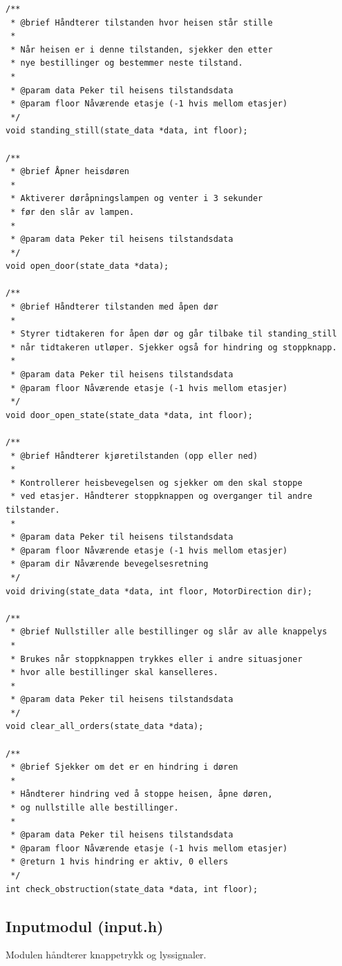\begin{lstlisting}[style=cpp, caption=Hovedfunksjoner i tilstandsmodulen]
/**
 * @brief Håndterer tilstanden hvor heisen står stille
 * 
 * Når heisen er i denne tilstanden, sjekker den etter
 * nye bestillinger og bestemmer neste tilstand.
 * 
 * @param data Peker til heisens tilstandsdata
 * @param floor Nåværende etasje (-1 hvis mellom etasjer)
 */
void standing_still(state_data *data, int floor);

/**
 * @brief Åpner heisdøren
 * 
 * Aktiverer døråpningslampen og venter i 3 sekunder
 * før den slår av lampen.
 * 
 * @param data Peker til heisens tilstandsdata
 */
void open_door(state_data *data);

/**
 * @brief Håndterer tilstanden med åpen dør
 * 
 * Styrer tidtakeren for åpen dør og går tilbake til standing_still
 * når tidtakeren utløper. Sjekker også for hindring og stoppknapp.
 * 
 * @param data Peker til heisens tilstandsdata
 * @param floor Nåværende etasje (-1 hvis mellom etasjer)
 */
void door_open_state(state_data *data, int floor);

/**
 * @brief Håndterer kjøretilstanden (opp eller ned)
 * 
 * Kontrollerer heisbevegelsen og sjekker om den skal stoppe
 * ved etasjer. Håndterer stoppknappen og overganger til andre tilstander.
 * 
 * @param data Peker til heisens tilstandsdata
 * @param floor Nåværende etasje (-1 hvis mellom etasjer)
 * @param dir Nåværende bevegelsesretning
 */
void driving(state_data *data, int floor, MotorDirection dir);

/**
 * @brief Nullstiller alle bestillinger og slår av alle knappelys
 * 
 * Brukes når stoppknappen trykkes eller i andre situasjoner
 * hvor alle bestillinger skal kanselleres.
 * 
 * @param data Peker til heisens tilstandsdata
 */
void clear_all_orders(state_data *data);

/**
 * @brief Sjekker om det er en hindring i døren
 * 
 * Håndterer hindring ved å stoppe heisen, åpne døren,
 * og nullstille alle bestillinger.
 * 
 * @param data Peker til heisens tilstandsdata
 * @param floor Nåværende etasje (-1 hvis mellom etasjer)
 * @return 1 hvis hindring er aktiv, 0 ellers
 */
int check_obstruction(state_data *data, int floor);
\end{lstlisting}

\subsection{Inputmodul (input.h)}
Modulen håndterer knappetrykk og lyssignaler.


